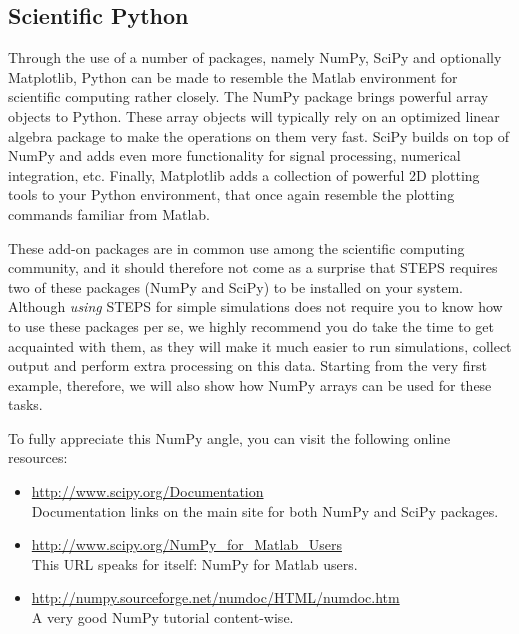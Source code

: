 \documentclass[a4paper,12pt]{book}
\begin{document}
\subsection{Scientific Python}

Through the use of a number of packages, namely NumPy, SciPy and optionally Matplotlib, Python can be made to resemble the Matlab environment for scientific computing rather closely. The NumPy package brings powerful array objects to Python. These array objects will typically rely on an optimized linear algebra package to make the operations on them very fast. SciPy builds on top of NumPy and adds even more functionality for signal processing, numerical integration, etc. Finally, Matplotlib adds a collection of powerful 2D plotting tools to your Python environment, that once again resemble the plotting commands familiar from Matlab.

These add-on packages are in common use among the scientific computing community, and it should therefore not come as a surprise that STEPS requires two of these packages (NumPy and SciPy) to be installed on your system. Although \emph{using} STEPS for simple simulations does not require you to know how to use these packages per se, we highly recommend you do take the time to get acquainted with them, as they will make it much easier to run simulations, collect output and perform extra processing on this data. Starting from the very first example, therefore, we will also show how NumPy arrays can be used for these tasks.

To fully appreciate this NumPy angle, you can visit the following online resources:

\begin{itemize}

\item
\url{http://www.scipy.org/Documentation}\\
Documentation links on the main site for both NumPy and SciPy packages.

\item
\url{http://www.scipy.org/NumPy_for_Matlab_Users}\\
This URL speaks for itself: NumPy for Matlab users.

\item
\url{http://numpy.sourceforge.net/numdoc/HTML/numdoc.htm}\\
A very good NumPy tutorial content-wise.

\end{itemize}
\end{document}
